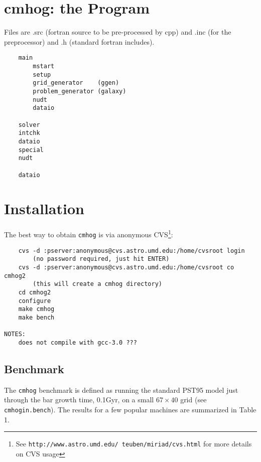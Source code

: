 \documentclass[11pt]{article}
\begin{document}
\section{cmhog: the Program}

Files are .src (fortran source to be pre-processed by cpp) and 
.inc (for the preprocessor) and .h (standard fortran includes).

\begin{verbatim}
    main    
        mstart
	    setup
	    grid_generator    (ggen)
	    problem_generator (galaxy)
	    nudt
        dataio
	
	solver
	intchk
	dataio
	special
	nudt
	
	dataio
\end{verbatim}

\section{Installation}

The best way to obtain {\tt cmhog} is via 
anonymous CVS\footnote{See {\tt http://www.astro.umd.edu/~teuben/miriad/cvs.html}
for more details on CVS usage}: 

\begin{verbatim}
	cvs -d :pserver:anonymous@cvs.astro.umd.edu:/home/cvsroot login
		(no password required, just hit ENTER)
	cvs -d :pserver:anonymous@cvs.astro.umd.edu:/home/cvsroot co cmhog2
		(this will create a cmhog directory)
	cd cmhog2
	configure
	make cmhog
	make bench

NOTES:
	does not compile with gcc-3.0 ???
\end{verbatim}

\newpage
\subsection{Benchmark}

The  {\tt cmhog} benchmark is defined as running the
standard PST95 model just through the bar growth time, 0.1Gyr,
on a small $67 \times 40$ grid (see {\tt cmhogin.bench}).
The results for a few popular machines are summarized
in Table 1.
\end{document}
